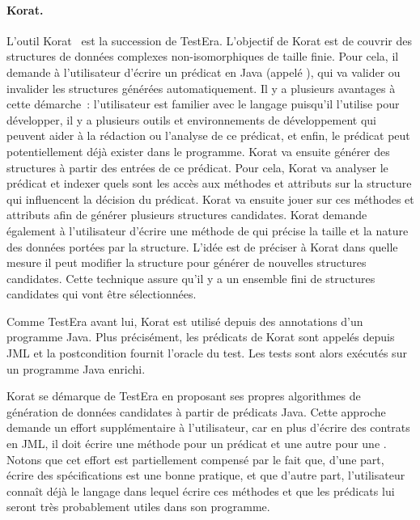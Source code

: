 \paragraph{Korat.} L'outil Korat~ est la succession de
Test\-Era. L'objectif de Korat est de couvrir des structures de données
complexes non-isomorphiques de taille finie. Pour cela, il demande à
l'utilisateur d'écrire un prédicat en Java (appelé ), qui va valider
ou invalider les structures générées automatiquement. Il y a plusieurs avantages
à cette démarche~: l'utilisateur est familier avec le langage puisqu'il
l'utilise pour développer, il y a plusieurs outils et environnements de
développement qui peuvent aider à la rédaction ou l'analyse de ce prédicat, et
enfin, le prédicat peut potentiellement déjà exister dans le programme. Korat va
ensuite générer des structures à partir des entrées de ce prédicat. Pour cela,
Korat va analyser le prédicat et indexer quels sont les accès aux méthodes et
attributs sur la structure qui influencent la décision du prédicat. Korat va
ensuite jouer sur ces méthodes et attributs afin de générer plusieurs structures
candidates. Korat demande également à l'utilisateur d'écrire une méthode de
 qui précise la taille et la nature des données portées
par la structure. L'idée est de préciser à Korat dans quelle mesure il peut
modifier la structure pour générer de nouvelles structures candidates. Cette
technique assure qu'il y a un ensemble fini de structures candidates qui vont
être sélectionnées.

Comme TestEra avant lui, Korat est utilisé depuis des annotations d'un programme
Java. Plus précisément, les prédicats de Korat sont appelés depuis JML et la
postcondition fournit l'oracle du test. Les tests sont alors exécutés sur un
programme Java enrichi.

Korat se démarque de TestEra en proposant ses propres algorithmes de génération
de données candidates à partir de prédicats Java. Cette approche demande un
effort supplémentaire à l'utilisateur, car en plus d'écrire des contrats en JML,
il doit écrire une méthode pour un prédicat et une autre pour une
. Notons que cet effort est partiellement compensé par
le fait que, d'une part, écrire des spécifications est une bonne pratique, et
que d'autre part, l'utilisateur connaît déjà le langage dans lequel écrire ces
méthodes et que les prédicats lui seront très probablement utiles dans son
programme.

